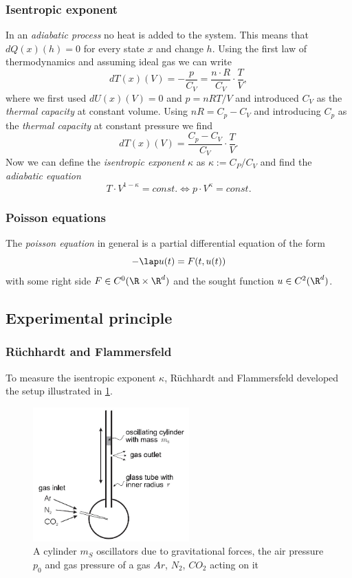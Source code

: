 \documentclass{subfiles}
\begin{document}
        \subsubsection*{Isentropic exponent}
            In an \emph{adiabatic process} no heat is added to the system. This means that $dQ(x)(h) = 0$ for every state $x$ and change $h$. Using the first law of thermodynamics and assuming ideal gas we can write
            \[dT(x)(V) = -\frac{p}{C_V} = \frac{n\cdot R}{C_V}\cdot\frac{T}{V},\]
            where we first used $dU(x)(V) = 0$ and $p = nRT/V$ and introduced $C_V$ as the \emph{thermal capacity} at constant volume. Using $nR = C_p-C_V$ and introducing $C_p$ as the \emph{thermal capacity} at constant pressure we find
            \[dT(x)(V) = \frac{C_p-C_V}{C_V} \cdot\frac{T}{V}.\]
            Now we can define the \emph{isentropic exponent} $\kappa$ as $\kappa:=C_P/C_V$ and find the \emph{adiabatic equation}
            \[T\cdot V^{1-\kappa} = \textit{const}. \Longleftrightarrow p\cdot V^\kappa = \textit{const}.\]

        \subsubsection*{Poisson equations}
            The \emph{poisson equation} in general is a partial differential equation of the form
            \[-\lap u(t) = F(t,u(t))\]
            with some right side $F\in C^0(\R\times\R^d)$ and the sought function $u\in C^2(\R^d)$.
    
    \subsection{Experimental principle}
        \subsubsection*{Rüchhardt and Flammersfeld}\label{sec:RuchhartFlammersfeld}
            To measure the isentropic exponent $\kappa$, Rüchhardt and Flammersfeld developed the setup illustrated in \ref{fig:RuchardtFlammersfeld}.

            \begin{figure}[H]
                \centering
                \includegraphics[width=6cm]{Bilddateien/Grundlagen/IsentropicRuchardtFlammersfeld.jpg}
                \caption{A cylinder $m_S$ oscillators due to gravitational forces, the air pressure $p_0$ and gas pressure of a gas $Ar$, $N_2$, $CO_2$ acting on it}
                \label{fig:RuchardtFlammersfeld}
            \end{figure}
\end{document}
